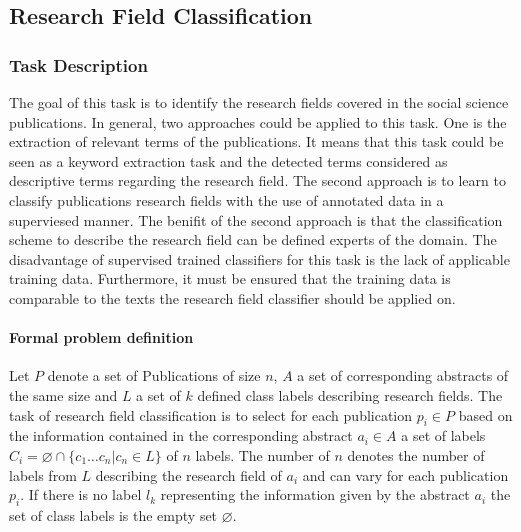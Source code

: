 
\subsection{Research Field Classification}
\label{section:field_classification}
\subsubsection{Task Description}
The goal of this task is to identify the research fields covered in the social science publications.
In general, two approaches could be applied to this task.
One is the extraction of relevant terms of the publications.
It means that this task could be seen as a keyword extraction task and the detected terms considered as descriptive terms regarding the research field.
The second approach is to learn to classify publications research fields with the use of annotated data in a superviesed manner.
The benifit of the second approach is that the classification scheme to describe the research field can be defined experts of the domain.
The disadvantage of supervised trained classifiers for this task is the lack of applicable training data.
Furthermore, it must be ensured that the training data is comparable to the texts the research field classifier should be applied on.

\paragraph{Formal problem definition}
Let $P$ denote a set of Publications of size $n$, $A$ a set of corresponding abstracts of the same size and $L$ a set of $k$ defined class labels describing research fields.
The task of research field classification is to select for each publication $p_i\in{P}$ based on the information contained in the corresponding abstract $a_i\in{A}$ a set of labels $C_i = \varnothing \cap \{c_1\dots c_n|c_n \in L\}$ of $n$ labels.
The number of $n$ denotes the number of labels from $L$ describing the research field of $a_i$ and can vary for each publication $p_i$.
If there is no label $l_k$ representing the information given by the abstract $a_i$ the set of class labels is the empty set $\varnothing$.



